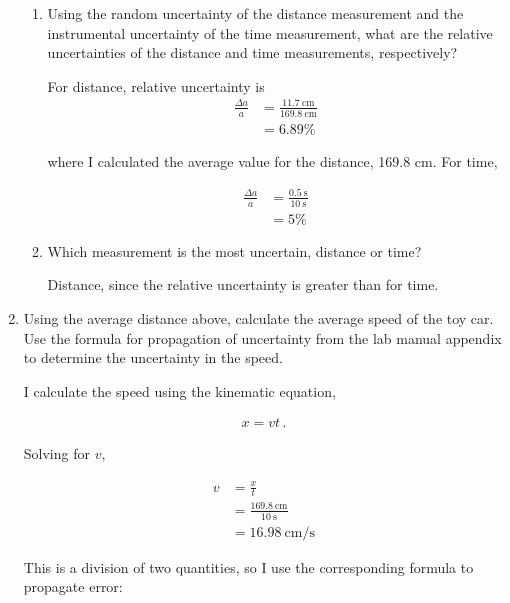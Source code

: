 \documentclass{article}
\begin{document}
\begin{enumerate}
\begin{enumerate}
		\item Using the random uncertainty of the distance measurement and the instrumental uncertainty of the time measurement, what are the relative uncertainties of the distance and time measurements, respectively?
		
		\begin{solution}
			For distance, relative uncertainty is
			\begin{align*}
				\frac{\Delta a}{a} &= \frac{11.7\:\mathrm{cm}}{169.8\:\mathrm{cm}} \\
				&= 6.89\%
			\end{align*}
			
			where I calculated the average value for the distance, 169.8 cm. For time,
			
			\begin{align*}
			 \frac{\Delta a}{a} &= \frac{0.5\:\mathrm{s}}{10\:\mathrm{s}} \\
			 &= 5\%
			\end{align*}
		\end{solution}
		
		\item Which measurement is the most uncertain, distance or time?
		
		\begin{solution}
			Distance, since the relative uncertainty is greater than for time.
		\end{solution}
	\end{enumerate}
	
	\item Using the average distance above, calculate the average speed of the toy car. Use the formula for propagation of uncertainty from the lab manual appendix to determine the uncertainty in the speed.
	
	\begin{solution}
		I calculate the speed using the kinematic equation,
		
		\begin{align*}
		 x = v t \,.
		\end{align*}
		
		Solving for $v$,
		
		\begin{align*}
		 v &= \frac{x}{t} \\
		 &= \frac{169.8\:\mathrm{cm}}{10\:\mathrm{s}} \\
		 &= 16.98\:\mathrm{cm}/\mathrm{s}
		\end{align*}
		
		This is a division of two quantities, so I use the corresponding formula to propagate error:
		

\end{solution}
\end{enumerate}
\end{document}
